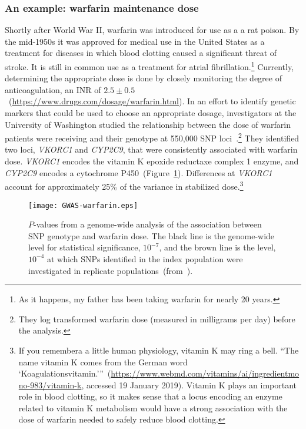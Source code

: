 \documentclass[12pt]{article}
\begin{document}
\subsubsection*{An example: warfarin maintenance
  dose}

Shortly after World War II, warfarin was introduced for use as a a rat
poison. By the mid-1950s it was approved for medical use in the United
States as a treatment for diseases in which blood clotting caused a
significant threat of stroke. It is still in common use as a treatment
for atrial fibrillation.\footnote{As it happens, my father has been
  taking warfarin for nearly 20 years.} Currently, determining the
appropriate dose is done by closely monitoring the degree of
anticoagulation, an INR of
$2.5 \pm 0.5$~(\url{https://www.drugs.com/dosage/warfarin.html}). In
an effort to identify genetic markers that could be used to choose an
appropriate dosage, investigators at the University of Washington
studied the relationship between the dose of warfarin patients were
receiving and their genotype at 550,000 SNP
loci~\cite{Cooper-etal-2008}.\footnote{They log transformed warfarin
  dose (measured in milligrams per day) before the analysis.} They
identified two loci, {\it VKORC1} and {\it CYP2C9}, that were
consistently associated with warfarin dose. {\it VKORC1} encodes the
vitamin K epoxide reductaxe complex 1 enzyme, and {\it CYP2C9} encodes
a cytochrome P450~(Figure~\ref{fig:GWAS-warfarin}). Differences at
{\it VKORC1} account for approximately 25\% of the variance in
stabilized dose.\footnote{If you remembera a little human physiology,
  vitamin K may ring a bell. ``The name vitamin K comes from the
  German word
  `Koagulationsvitamin.'''~(\url{https://www.webmd.com/vitamins/ai/ingredientmono-983/vitamin-k},
  accessed 19 January 2019). Vitamin K plays an important role in
  blood clotting, so it makes sense that a locus encoding an enzyme
  related to vitamin K metabolism would have a strong association with
  the dose of warfarin needed to safely reduce blood clotting.}

\begin{figure}
\begin{center}
\texttt{[image: GWAS-warfarin.eps]}
\end{center}
  \caption{$P$-values from a genome-wide analysis of the association
    between SNP genotype and warfarin dose. The black line is the
    genome-wide level for statistical significance, $10^{-7}$, and the
    brown line is the level, $10^{-4}$ at which SNPs identified in the
    index population were investigated in replicate
    populations~(from~\cite{Cooper-etal-2008}).}\label{fig:GWAS-warfarin}
\end{figure}
\end{document}
